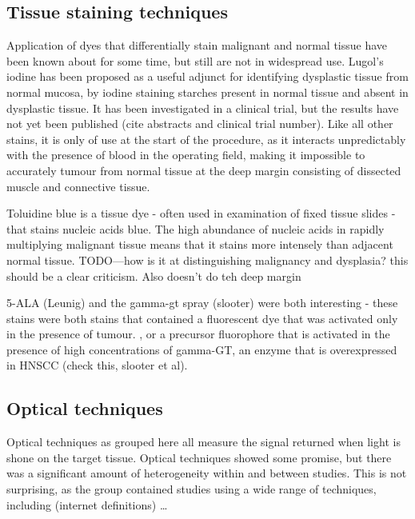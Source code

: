 \subsection{Tissue staining techniques}

Application of dyes that differentially stain malignant and normal tissue have been known about for some time, but still are not in widespread use.
Lugol's iodine has been proposed as a useful adjunct for identifying dysplastic tissue from normal mucosa, by iodine staining starches present in normal tissue and absent in dysplastic tissue.
It has been investigated in a clinical trial, but the results have not yet been published (cite abstracts and clinical trial number).
Like all other stains, it is only of use at the start of the procedure, as it interacts unpredictably with the presence of blood in the operating field, making it impossible to accurately tumour from normal tissue at the deep margin consisting of dissected muscle and connective tissue.

Toluidine blue is a tissue dye - often used in examination of fixed tissue slides - that stains nucleic acids blue.
The high abundance of nucleic acids in rapidly multiplying malignant tissue means that it stains more intensely than adjacent normal tissue.
TODO---how is it at distinguishing malignancy and dysplasia? this should be a clear criticism. 
Also doesn't do teh deep margin

5-ALA (Leunig) and the gamma-gt spray (slooter) were both interesting - these stains were both stains that contained a fluorescent dye that was activated only in the presence of tumour. 
, or a precursor fluorophore that is activated in the presence of high concentrations of gamma-GT, an enzyme that is overexpressed in HNSCC (check this, slooter et al).

\subsection{Optical techniques}

Optical techniques as grouped here all measure the signal returned when light is shone on the target tissue.
Optical techniques showed some promise, but there was a significant amount of heterogeneity within and between studies. 
This is not surprising, as the group contained studies using a wide range of techniques, including (internet definitions) \ldots

